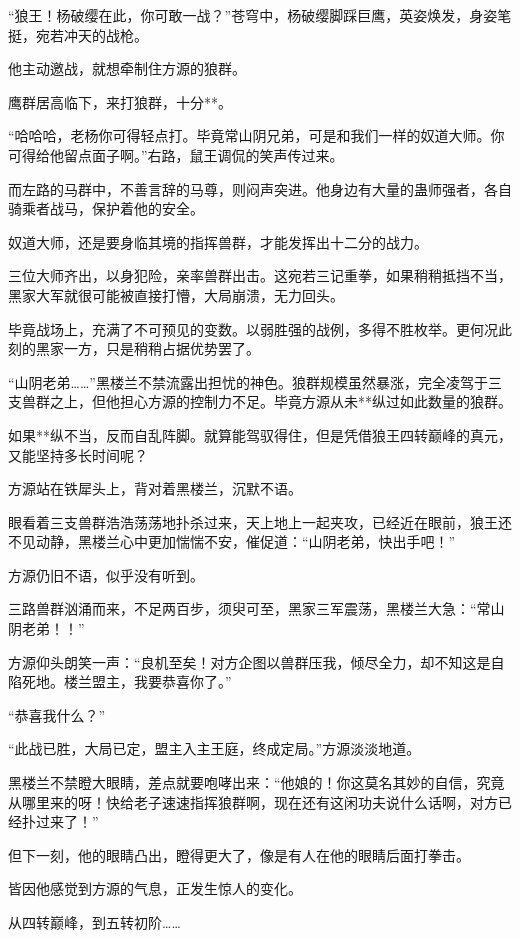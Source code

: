 \begin{this_body}
“狼王！杨破缨在此，你可敢一战？”苍穹中，杨破缨脚踩巨鹰，英姿焕发，身姿笔挺，宛若冲天的战枪。

他主动邀战，就想牵制住方源的狼群。

鹰群居高临下，来打狼群，十分**。

“哈哈哈，老杨你可得轻点打。毕竟常山阴兄弟，可是和我们一样的奴道大师。你可得给他留点面子啊。”右路，鼠王调侃的笑声传过来。

而左路的马群中，不善言辞的马尊，则闷声突进。他身边有大量的蛊师强者，各自骑乘者战马，保护着他的安全。

奴道大师，还是要身临其境的指挥兽群，才能发挥出十二分的战力。

三位大师齐出，以身犯险，亲率兽群出击。这宛若三记重拳，如果稍稍抵挡不当，黑家大军就很可能被直接打懵，大局崩溃，无力回头。

毕竟战场上，充满了不可预见的变数。以弱胜强的战例，多得不胜枚举。更何况此刻的黑家一方，只是稍稍占据优势罢了。

“山阴老弟……”黑楼兰不禁流露出担忧的神色。狼群规模虽然暴涨，完全凌驾于三支兽群之上，但他担心方源的控制力不足。毕竟方源从未**纵过如此数量的狼群。

如果**纵不当，反而自乱阵脚。就算能驾驭得住，但是凭借狼王四转巅峰的真元，又能坚持多长时间呢？

方源站在铁犀头上，背对着黑楼兰，沉默不语。

眼看着三支兽群浩浩荡荡地扑杀过来，天上地上一起夹攻，已经近在眼前，狼王还不见动静，黑楼兰心中更加惴惴不安，催促道：“山阴老弟，快出手吧！”

方源仍旧不语，似乎没有听到。

三路兽群汹涌而来，不足两百步，须臾可至，黑家三军震荡，黑楼兰大急：“常山阴老弟！！”

方源仰头朗笑一声：“良机至矣！对方企图以兽群压我，倾尽全力，却不知这是自陷死地。楼兰盟主，我要恭喜你了。”

“恭喜我什么？”

“此战已胜，大局已定，盟主入主王庭，终成定局。”方源淡淡地道。

黑楼兰不禁瞪大眼睛，差点就要咆哮出来：“他娘的！你这莫名其妙的自信，究竟从哪里来的呀！快给老子速速指挥狼群啊，现在还有这闲功夫说什么话啊，对方已经扑过来了！”

但下一刻，他的眼睛凸出，瞪得更大了，像是有人在他的眼睛后面打拳击。

皆因他感觉到方源的气息，正发生惊人的变化。

从四转巅峰，到五转初阶……


\end{this_body}
